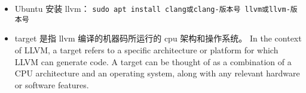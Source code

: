 
\begin{issues}
\issueDraft
\end{issues}


\begin{itemize}
\item Ubuntu 安装 llvm： \verb|sudo apt install clang或clang-版本号 llvm或llvm-版本号|
\item target 是指 llvm 编译的机器码所运行的 cpu 架构和操作系统。 In the context of LLVM, a target refers to a specific architecture or platform for which LLVM can generate code. A target can be thought of as a combination of a CPU architecture and an operating system, along with any relevant hardware or software features.
\end{itemize}
